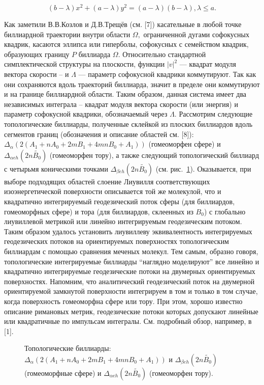 $$ (b-\lambda)x^2+(a-\lambda)y^2=(a-\lambda)(b-\lambda),   \lambda\le a.$$


Как заметили В.В.Козлов и Д.В.Трещёв (см. [7]) касательные в любой точке биллиардной траектории внутри области $\Omega,$ ограниченной дугами софокусных квадрик,
касаются эллипса или гиперболы, софокусных с семейством квадрик, образующих границу $P$ биллиарда $\Omega$.
Относительно стандартной симплектической структуры на плоскости, функции $|v|^2$ --- квадрат модуля вектора скорости -- и $\Lambda$ --- параметр софокусной квадрики
коммутируют. Так как они сохраняются вдоль траекторий биллиарда, значит в пределе они коммутируют и на границе биллиардной области.
 Таким
образом, данная   система имеет два независимых   интеграла  --   квадрат модуля вектора скорости (или энергия) и параметр софокусной квадрики, обозначаемый через $\Lambda.$
Рассмотрим следующие топологические биллиарды, полученные склейкой из плоских биллиардов вдоль сегментов границ (обозначения и описание областей см. [8]): $\Delta_\alpha(2(A_1+nA_0+2mB_1+4mnB_0+A_1)) $ (гомеоморфен сфере)
и
  $\Delta_{\alpha eh}(2n \widetilde{B_0}) $ (гомеоморфен тору), а  также следующий топологический биллиард с четырьмя коническими точками $\Delta_{\beta eh}(2n \widetilde{B_0})  $ (см. рис.~\ref{topologicalbilliards}). Оказывается, при выборе подходящих областей слоение Лиувилля соответствующих изоэнергетической поверхности описывается той же молекулой, что и квадратично интегрируемый геодезический поток   сферы (для биллиардов, гомеоморфных сфере) и тора (для биллиардов, склеенных из $B_0$) с глобально лиувиллевой метрикой или линейно интегрируемым геодезическим потоком.  Таким образом удалось установить лиувиллеву эквивалентность    интегрируемых геодезических потоков на ориентируемых поверхностях топологическим  биллиардам  с помощью сравнения меченых молекул. Тем самым, образно говоря, топологические  интегрируемые биллиарды ``наглядно моделируют''  все линейно и квадратично интегрируемые геодезические потоки на двумерных  ориентируемых поверхностях. Напомним, что аналитический геодезический поток на двумерной ориентируемой замкнутой поверхности интегрируем в том и только в том случае, когда поверхность гомеоморфна сфере или тору.  При этом, хорошо известно описание римановых метрик, геодезические потоки которых допускают линейные или квадратичные по импульсам интегралы. См. подробный обзор, например, в [1].





  \begin{figure}[h!]


  \caption{Топологические биллиарды:  $\Delta_\alpha(2(A_1+nA_0+2mB_1+4mnB_0+A_1))  $ и $\Delta_{\beta eh}(2n \widetilde{B_0})  $ (гомеоморфные сфере)
и
  $\Delta_{\alpha eh}(2n \widetilde{B_0}) $ (гомеоморфен тору). }\label{topologicalbilliards}
\end{figure}

